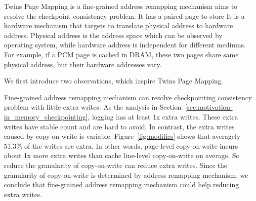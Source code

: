 \documentclass[conference]{IEEEtran}
\begin{document}
Twins Page Mapping is a fine-grained address remapping mechanism aims to resolve the checkpoint consistency problem.
It has a paired page to store
It is a hardware mechanism that targets to translate physical address to hardware address.
Physical address is the address space which can be observed by operating system, while hardware address is independent for different mediums.
For example, if a PCM page is cached in DRAM, these two pages share same physical address, but their hardware addresses vary.

We first introduce two observations, which inspire Twins Page Mapping.
\begin{enumerate*}
    \item Fine-grained address remapping mechanism can resolve checkpointing consistency problem with little extra writes.
		As the analysis in Section~\ref{sec:motivation-in_memory_checkpointing}, logging has at least 1x extra writes.
		These extra writes have stable count and are hard to avoid.
        In contrast, the extra writes caused by copy-on-write is variable.
        Figure~\ref{fig:modifies} shows that averagely 51.3\% of the writes are extra.
        In other words, page-level copy-on-write incurs about 1x more extra writes than cache line-level copy-on-write on average.
        So reduce the granularity of copy-on-write can reduce extra writes.
        Since the granularity of copy-on-write is determined by address remapping mechanism, we conclude that fine-grained address remapping mechanism could help reducing extra writes.


\end{enumerate*}
\end{document}

